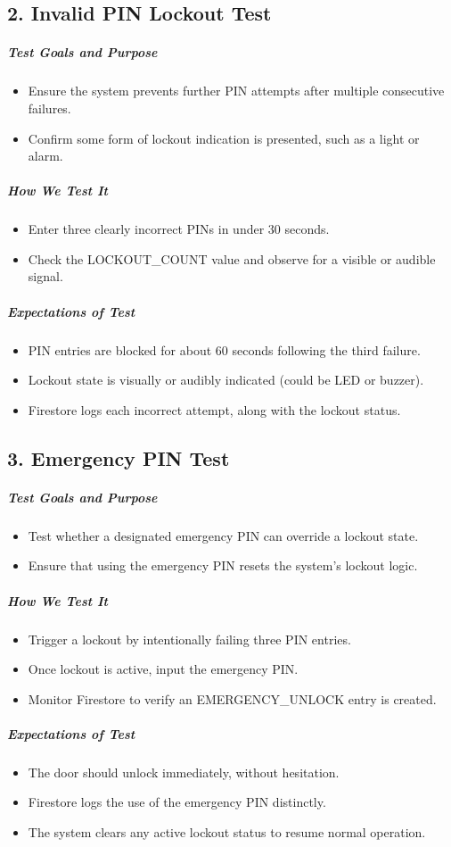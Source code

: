 \subsection*{2. Invalid PIN Lockout Test}
\subparagraph{Test Goals and Purpose}
\begin{itemize}
    \item Ensure the system prevents further PIN attempts after multiple consecutive failures.
    \item Confirm some form of lockout indication is presented, such as a light or alarm.
\end{itemize}
\subparagraph{How We Test It}
\begin{itemize}
    \item Enter three clearly incorrect PINs in under 30 seconds.
    \item Check the LOCKOUT\_COUNT value and observe for a visible or audible signal.
\end{itemize}
\subparagraph{Expectations of Test}
\begin{itemize}
    \item PIN entries are blocked for about 60 seconds following the third failure.
    \item Lockout state is visually or audibly indicated (could be LED or buzzer).
    \item Firestore logs each incorrect attempt, along with the lockout status.
\end{itemize}

\subsection*{3. Emergency PIN Test}
\subparagraph{Test Goals and Purpose}
\begin{itemize}
    \item Test whether a designated emergency PIN can override a lockout state.
    \item Ensure that using the emergency PIN resets the system's lockout logic.
\end{itemize}
\subparagraph{How We Test It}
\begin{itemize}
    \item Trigger a lockout by intentionally failing three PIN entries.
    \item Once lockout is active, input the emergency PIN.
    \item Monitor Firestore to verify an EMERGENCY\_UNLOCK entry is created.
\end{itemize}
\subparagraph{Expectations of Test}
\begin{itemize}
    \item The door should unlock immediately, without hesitation.
    \item Firestore logs the use of the emergency PIN distinctly.
    \item The system clears any active lockout status to resume normal operation.
\end{itemize}

